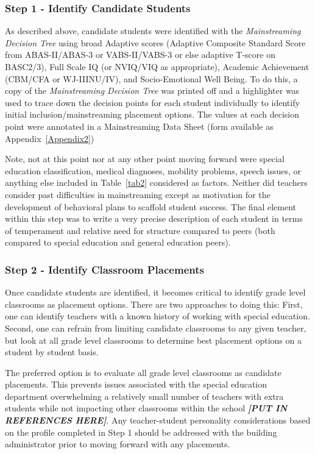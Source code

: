 \documentclass[twoside]{article}
\begin{document}
\subsubsection{Step 1 - Identify Candidate Students}
As described above, candidate students were identified with the \textit{Mainstreaming Decision Tree} using broad Adaptive scores (Adaptive Composite Standard Score from ABAS-II/ABAS-3 or VABS-II/VABS-3 or else adaptive T-score on BASC2/3), Full Scale IQ (or NVIQ/VIQ as appropriate), Academic Achievement (CBM/CFA or WJ-IIINU/IV), and Socio-Emotional Well Being. To do this, a copy of the \textit{Mainstreaming Decision Tree} was printed off and a highlighter was used to trace down the decision points for each student individually to identify initial inclusion/mainstreaming placement options. The values at each decision point were annotated in a Mainstreaming Data Sheet (form available as Appendix~\ref{Appendix2})

Note, not at this point nor at any other point moving forward were special education classification, medical diagnoses, mobility problems, speech issues, or anything else included in Table~\ref{tab2} considered as factors. Neither did teachers consider past difficulties in mainstreaming except as motivation for the development of behavioral plans to scaffold student success. The final element within this step was to write a very precise description of each student in terms of temperament and relative need for structure compared to peers (both compared to special education and general education peers).

\subsubsection{Step 2 - Identify Classroom Placements}
Once candidate students are identified, it becomes critical to identify grade level classrooms as placement options. There are two approaches to doing this: First, one can identify teachers with a known history of working with special education. Second, one can refrain from limiting candidate classrooms to any given teacher, but look at all grade level classrooms to determine best placement options on a student by student basis.

The preferred option is to evaluate all grade level classrooms as candidate placements. This prevents issues associated with the special education department overwhelming a relatively small number of teachers with extra students while not impacting other classrooms within the school \textit{\textbf{[PUT IN REFERENCES HERE]}}. Any teacher-student personality considerations based on the profile completed in Step 1 should be addressed with the building administrator prior to moving forward with any placements. 
\end{document}
